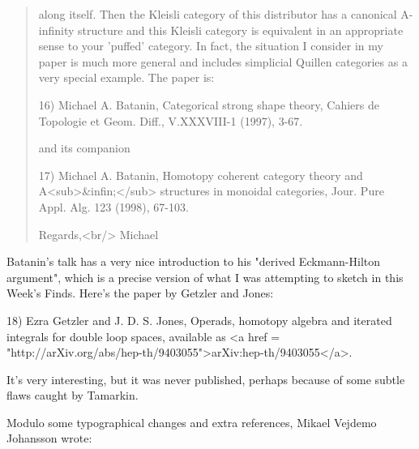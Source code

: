 \begin{quote}
   along itself.  Then the Kleisli category of this distributor has a 
   canonical A-infinity structure and this Kleisli category is equivalent 
   in an appropriate sense to your 'puffed' category.  In fact, the 
   situation I consider in my paper is much more general and includes 
   simplicial Quillen categories as a very special example.  The paper is:

   16) Michael A. Batanin, Categorical strong shape theory, Cahiers de 
   Topologie et Geom. Diff., V.XXXVIII-1 (1997), 3-67. 

   and its companion 

   17) Michael A. Batanin, Homotopy coherent category theory and 
   A<sub>&infin;</sub> structures in monoidal categories, Jour. Pure Appl. 
   Alg. 123 (1998), 67-103.

  Regards,<br/>
  Michael 
\end{quote}
    

Batanin's talk has a very nice introduction to his "derived 
Eckmann-Hilton argument", which is a precise version of what I was 
attempting to sketch in this Week's Finds.  Here's the paper by
Getzler and Jones:

18) Ezra Getzler and J. D. S. Jones, Operads, homotopy algebra and 
iterated integrals for double loop spaces, available as 
<a href = "http://arXiv.org/abs/hep-th/9403055">arXiv:hep-th/9403055</a>.

It's very interesting, but it was never published, perhaps because 
of some subtle flaws caught by Tamarkin. 

Modulo some typographical changes and extra references, Mikael Vejdemo
Johansson wrote:

